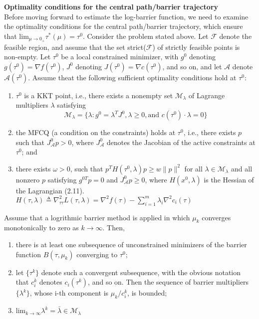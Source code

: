 \documentclass[14pt]{extreport}
\begin{document}
\textbf{Optimality conditions for the central path/barrier trajectory}\\
Before moving forward to estimate the log-barrier function, we need to examine the optimality conditions for the central path/barrier trajectory, which ensure that $\text{lim}_{\mu \to 0_{+}} \tau^*(\mu) = \tau^0$.  Consider the problem stated above.  Let $\mathcal{F}$ denote the feasible region, and assume that the set strict($\mathcal{F}$) of strictly feasible points is non-empty. Let $\tau^0$ be a local constrained minimizer, with $g^0$ denoting $g(\tau^0) = \nabla f(\tau^0)$, $J^0$ denoting $J(\tau^0) = \nabla c(\tau^0)$, and so on, and let $\mathcal{A}$ denote $\mathcal{A}(\tau^0)$. Assume theat the following sufficient optimality conditions hold at $\tau^0$:
\begin{enumerate}[label=(\alph*)]
	\item $\tau^0$ is a KKT point, i.e., there exists a nonempty set $\mathcal{M}_{\lambda}$ of Lagrange multipliers $\lambda$ satisfying 
	$$\mathcal{M}_{\lambda} = \{ \lambda: g^0 = \lambda^TJ^{0}, \lambda \ge 0, \text{and } c(\tau^0)\cdot \lambda = 0 \}$$
	\item the MFCQ (a condition on the constraints) holds at $\tau^0$, i.e., there exists $p$ such that $J^0_{\mathcal{A}}p > 0$, where $J^0_{\mathcal{A}}$ denotes the Jacobian of the active constraints at $\tau^0$; and
	\item there exists $\omega > 0$, such that $p^T H(\tau^0, \lambda)p \ge w \| p\|^2 $ for all $\lambda \in \mathcal{M}_{\lambda}$ and all nonzero $p$ satisfying $g^{0T}p=0$ and $J^0_{\mathcal{A}} p \ge 0$, where $H(x^0, \lambda)$ is the Hessian of the Lagrangian (2.11). $H(\tau, \lambda) \triangleq \nabla^2_{\tau\tau} L(\tau, \lambda) =  \nabla^2 f(\tau) - \sum_{i=1}^{m} \lambda_i \nabla^2 c_i(\tau)$
\end{enumerate}
Assume that a logrithmic barrier method is applied in which $\mu_{k}$ converges monotonically to zero as $k \to \infty$. Then, 
\begin{enumerate}[label=(\roman*)]
	\item there is at least one subsequence of unconstrained minimizers of the barrier function $B(\tau, \mu_k)$ converging to $\tau^0$; 
	\item let $\{ \tau^k\}$ denote such a convergent subsequence, with the obvious notation that $c_i^k$ denotes $c_i(\tau^k)$, and so on. Then the sequence of barrier multipliers $\{ \lambda^{k}\}$, whose i-th component is $\mu_k / c_i^k$, is bounded;
	\item $\text{lim}_{k \to \infty} \lambda^k = \bar{\lambda} \in \mathcal{M}_{\lambda}$
\end{enumerate} 
\end{document}
